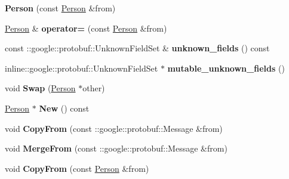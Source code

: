 \begin{DoxyCompactItemize}
\item 
\hypertarget{class_person_aa680de7bbb66e20bb6d30ba5d0c9611b}{}{\bfseries Person} (const \hyperlink{class_person}{Person} \&from)\label{class_person_aa680de7bbb66e20bb6d30ba5d0c9611b}

\item 
\hypertarget{class_person_ab9ff5f4b2b4280a2e92ea0fca72cf954}{}\hyperlink{class_person}{Person} \& {\bfseries operator=} (const \hyperlink{class_person}{Person} \&from)\label{class_person_ab9ff5f4b2b4280a2e92ea0fca72cf954}

\item 
\hypertarget{class_person_a414a542b9b7a4fcbd0aada889c8cd9c0}{}const \+::google\+::protobuf\+::\+Unknown\+Field\+Set \& {\bfseries unknown\+\_\+fields} () const \label{class_person_a414a542b9b7a4fcbd0aada889c8cd9c0}

\item 
\hypertarget{class_person_a21dc26cbaf38d3b1a7b54377dd40a4fe}{}inline\+::google\+::protobuf\+::\+Unknown\+Field\+Set $\ast$ {\bfseries mutable\+\_\+unknown\+\_\+fields} ()\label{class_person_a21dc26cbaf38d3b1a7b54377dd40a4fe}

\item 
\hypertarget{class_person_a7cb1be8b2a53b49eff7f996b801276fb}{}void {\bfseries Swap} (\hyperlink{class_person}{Person} $\ast$other)\label{class_person_a7cb1be8b2a53b49eff7f996b801276fb}

\item 
\hypertarget{class_person_a627e2b22b6b98290e86a7c91fdee962b}{}\hyperlink{class_person}{Person} $\ast$ {\bfseries New} () const \label{class_person_a627e2b22b6b98290e86a7c91fdee962b}

\item 
\hypertarget{class_person_a81251b997d52f7fae6d2085fde7acf66}{}void {\bfseries Copy\+From} (const \+::google\+::protobuf\+::\+Message \&from)\label{class_person_a81251b997d52f7fae6d2085fde7acf66}

\item 
\hypertarget{class_person_aa9df68d179faaa8aa9cda31cd9fd7c16}{}void {\bfseries Merge\+From} (const \+::google\+::protobuf\+::\+Message \&from)\label{class_person_aa9df68d179faaa8aa9cda31cd9fd7c16}

\item 
\hypertarget{class_person_a93ef2f991692282b1ad4f5281114a5a6}{}void {\bfseries Copy\+From} (const \hyperlink{class_person}{Person} \&from)\label{class_person_a93ef2f991692282b1ad4f5281114a5a6}


\end{DoxyCompactItemize}
